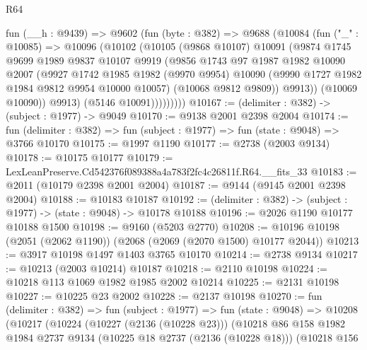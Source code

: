 \begin{lexlean}{R64}
\begin{coremodule}
            fun (__h : @9439) =>
            @9602
              (fun (byte : @382) =>
              @9688
                (@10084
                  (fun ("_" : @10085) =>
                  @10096
                    (@10102
                      (@10105
                        (@9868 @10107)
                        @10091
                        (@9874
                          @1745
                          @9699
                          @1989
                          @9837
                          @10107
                          @9919
                          (@9856
                            @1743
                            @97
                            @1987
                            @1982
                            @10090
                            @2007
                            (@9927
                              @1742
                              @1985
                              @1982
                              (@9970 @9954)
                              @10090
                              (@9990 @1727 @1982 @1984 @9812 @9954 @10000 @10057)
                              (@10068 @9812 @9809))
                            @9913))
                        (@10069 @10090))
                      @9913)
                    (@5146 @10091)))))))))
@10167 := (delimiter : @382) -> (subject : @1977) -> @9049
@10170 := @9138 @2001 @2398 @2004
@10174 := fun (delimiter : @382) => fun (subject : @1977) => fun (state : @9048) => @3766 @10170
@10175 := @1997 @1190
@10177 := @2738 (@2003 @9134)
@10178 := @10175 @10177
@10179 := LexLeanPreserve.Cd542376f089388a4a783f2fc4c26811f.R64.__fits_33
@10183 := @2011 (@10179 @2398 @2001 @2004)
@10187 := @9144 (@9145 @2001 @2398 @2004)
@10188 := @10183 @10187
@10192 := (delimiter : @382) -> (subject : @1977) -> (state : @9048) -> @10178 @10188
@10196 := @2026 @1190 @10177 @10188 @1500
@10198 := @9160 (@5203 @2770)
@10208 := @10196 @10198 (@2051 (@2062 @1190)) (@2068 (@2069 (@2070 @1500) @10177 @2044))
@10213 := @3917 @10198 @1497 @1403 @3765 @10170
@10214 := @2738 @9134
@10217 := @10213 (@2003 @10214) @10187
@10218 := @2110 @10198
@10224 := @10218 @113 @1069 @1982 @1985 @2002 @10214
@10225 := @2131 @10198
@10227 := @10225 @23 @2002
@10228 := @2137 @10198
@10270 := fun (delimiter : @382) =>
  fun (subject : @1977) =>
  fun (state : @9048) =>
  @10208
    (@10217
      (@10224
        (@10227 (@2136 (@10228 @23)))
        (@10218
          @86
          @158
          @1982
          @1984
          @2737
          @9134
          (@10225 @18 @2737 (@2136 (@10228 @18)))
          (@10218
            @156

\end{coremodule}
\end{lexlean}

